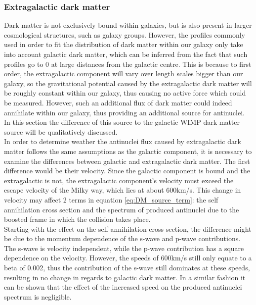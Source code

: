 \subsubsection{Extragalactic dark matter}
Dark matter is not exclusively bound within galaxies, but is also present in larger cosmological structures, such as galaxy groups. However, the profiles commonly used in order to fit the distribution of dark matter within our galaxy only take into account galactic dark matter, which can be inferred from the fact that such profiles go to 0 at large distances from the galactic centre. This is because to first order, the extragalactic component will vary over length scales bigger than our galaxy, so the gravitational potential caused by the extragalactic dark matter will be roughly constant within our galaxy, thus causing no active force which could be measured. However, such an additional flux of dark matter could indeed annihilate within our galaxy, thus providing an additional source for antinuclei. In this section the difference of this source to the galactic WIMP dark matter source will be qualitatively discussed. \\ 

In order to determine weather the antinuclei flux caused by extragalactic dark matter follows the same assumptions as the galactic component, it is necessary to examine the differences between galactic and extragalactic dark matter. The first difference would be their velocity. Since the galactic component is bound and the extragalactic is not, the extragalactic component's velocity must exceed the escape velocity of the Milky way, which lies at about 600km/s. This change in velocity may affect 2 terms in equation \ref{eq:DM_source_term}: the self annihilation cross section and the spectrum of produced antinuclei due to the boosted frame in which the collision takes place. \\
Starting with the effect on the self annihilation cross section, the difference might be due to the momentum dependence of the s-wave and p-wave contributions. The s-wave is velocity independent, while the p-wave contribution has a square dependence on the velocity. However, the speeds of 600km/s still only equate to a beta of 0.002, thus the contribution of the s-wave still dominates at these speeds, resulting in no change in regards to galactic dark matter. In a similar fashion it can be shown that the effect of the increased speed on the produced antinuclei spectrum is negligible. \\

